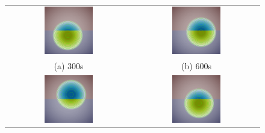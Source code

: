\begin{figure}[tpb]
	\centering
	\begin{tabular}{cc}
		\includegraphics[width=0.4\textwidth]{decomposition-test-figures/parabolic-bowl-2O-2D-depth-300s.png} &
		\includegraphics[width=0.4\textwidth]{decomposition-test-figures/parabolic-bowl-2O-2D-depth-600s.png} \\
		(a) 300s &
		(b) 600s \\[6pt]
		\includegraphics[width=0.4\textwidth]{decomposition-test-figures/parabolic-bowl-2O-2D-depth-900s.png} &
		\includegraphics[width=0.4\textwidth]{decomposition-test-figures/parabolic-bowl-2O-2D-depth-1800s.png} \\

\end{tabular}
\end{figure}
